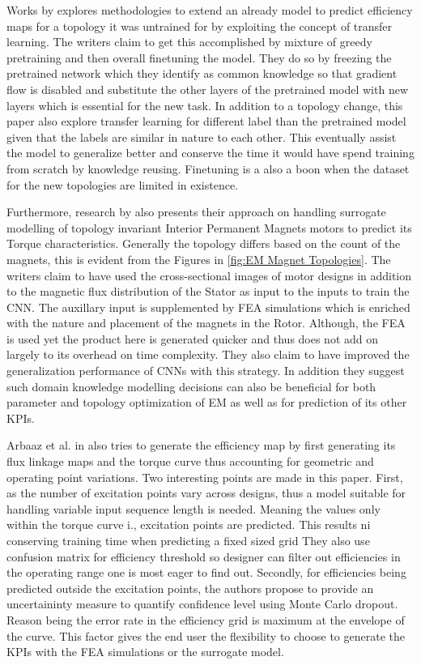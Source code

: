 \documentclass{report} %
\begin{document}
Works by \cite{EM TL-2020} explores methodologies to extend an already model to predict efficiency maps for a topology it was untrained for by exploiting 
the concept of transfer learning. The writers claim to get this accomplished by mixture of greedy pretraining and then overall finetuning the model.
They do so by freezing the pretrained network which they identify as common knowledge so that gradient flow is disabled and substitute the other 
layers of the pretrained model with new layers which is essential for the new task.
In addition to a topology change, this paper also explore transfer learning for different label than the pretrained model given that the labels are similar in nature to each other. 
This eventually assist the model to generalize better and conserve the time it would have spend training from scratch by knowledge reusing. 
Finetuning is a also a boon when the dataset for the new topologies are limited in existence.

Furthermore, research by \cite{EM CNN-2024} also presents their approach on handling surrogate modelling of topology invariant Interior 
Permanent Magnets motors to predict its Torque characteristics.
Generally the topology differs based on the count of the magnets, this is evident from the Figures in \ref{fig:EM Magnet Topologies}.
The writers claim to have used the cross-sectional images of motor designs in addition to the magnetic flux distribution of the Stator as input to the
inputs to train the \ac{CNN}. The auxillary input is supplemented by \ac{FEA} simulations which is enriched with the nature and placement of 
the magnets in the Rotor. Although, the \ac{FEA} is used yet the product here is generated quicker and thus does not add on largely to its overhead on time complexity. 
They also claim to have improved the generalization performance of \ac{CNN}s with this strategy. In addition they suggest such domain knowledge modelling decisions 
can also be beneficial for both parameter and topology optimization of \ac{EM} as well as for prediction of its other \ac{KPI}s.

Arbaaz et al. in \cite{DL-ETA-2019} also tries to generate the efficiency map by first generating its flux linkage maps and the torque curve 
thus accounting for geometric and operating point variations. Two interesting points are made in this paper.
First, as the number of excitation points vary across designs, thus a model suitable for handling variable input sequence length is needed.
Meaning the values only within the torque curve i., excitation points are predicted. This results ni conserving training time when predicting a fixed sized grid
They also use confusion matrix for efficiency threshold so designer can filter out efficiencies in the operating range one is most eager to find out.
Secondly, for efficiencies being predicted outside the excitation points, the authors propose to provide an uncertaininty measure to quantify confidence level using Monte Carlo dropout.
Reason being the error rate in the efficiency grid is maximum at the envelope of the curve. This factor gives the end user 
the flexibility to choose to generate the \ac{KPI}s with the \ac{FEA} simulations or the surrogate model.
\end{document}
